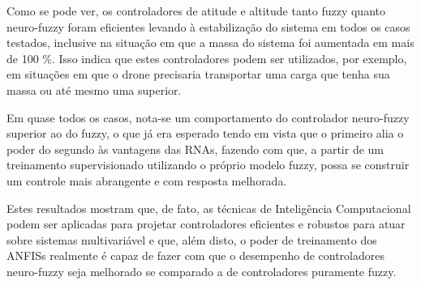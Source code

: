 Como se pode ver, os controladores de atitude e altitude tanto fuzzy quanto neuro-fuzzy foram eficientes levando à estabilização do sistema em todos os casos testados, inclusive na situação em que a massa do sistema foi aumentada em mais de 100 \%. Isso indica que estes controladores podem ser utilizados, por exemplo, em situações em que o drone precisaria transportar uma carga que tenha sua massa ou até mesmo uma superior.

Em quase todos os casos, nota-se um comportamento do controlador neuro-fuzzy superior ao do fuzzy, o que já era esperado tendo em vista que o primeiro alia o poder do segundo às vantagens das RNAs, fazendo com que, a partir de um treinamento supervisionado utilizando o próprio modelo fuzzy, possa se construir um controle mais abrangente e com resposta melhorada.

Estes resultados mostram que, de fato, as técnicas de Inteligência Computacional podem ser aplicadas para projetar controladores eficientes e robustos para atuar sobre sistemas multivariável e que, além disto, o poder de treinamento dos ANFISs realmente é capaz de fazer com que o desempenho de controladores neuro-fuzzy seja melhorado se comparado a de controladores puramente fuzzy.
